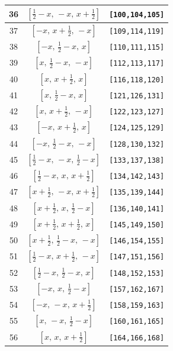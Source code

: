 \documentclass[fleqn,8pt]{jsarticle}
\begin{document}
\begin{longtable}{ccc}
36 & $\left[ \frac{1}{2} - x,\, - x,\, x + \frac{1}{2} \right]$ & {\tt [100,104,105]} \\ \hline
37 & $\left[ - x,\, x + \frac{1}{2},\, - x \right]$ & {\tt [109,114,119]} \\ \hline
38 & $\left[ - x,\, \frac{1}{2} - x,\, x \right]$ & {\tt [110,111,115]} \\ \hline
39 & $\left[ x,\, \frac{1}{2} - x,\, - x \right]$ & {\tt [112,113,117]} \\ \hline
40 & $\left[ x,\, x + \frac{1}{2},\, x \right]$ & {\tt [116,118,120]} \\ \hline
41 & $\left[ x,\, \frac{1}{2} - x,\, x \right]$ & {\tt [121,126,131]} \\ \hline
42 & $\left[ x,\, x + \frac{1}{2},\, - x \right]$ & {\tt [122,123,127]} \\ \hline
43 & $\left[ - x,\, x + \frac{1}{2},\, x \right]$ & {\tt [124,125,129]} \\ \hline
44 & $\left[ - x,\, \frac{1}{2} - x,\, - x \right]$ & {\tt [128,130,132]} \\ \hline
45 & $\left[ \frac{1}{2} - x,\, - x,\, \frac{1}{2} - x \right]$ & {\tt [133,137,138]} \\ \hline
46 & $\left[ \frac{1}{2} - x,\, x,\, x + \frac{1}{2} \right]$ & {\tt [134,142,143]} \\ \hline
47 & $\left[ x + \frac{1}{2},\, - x,\, x + \frac{1}{2} \right]$ & {\tt [135,139,144]} \\ \hline
48 & $\left[ x + \frac{1}{2},\, x,\, \frac{1}{2} - x \right]$ & {\tt [136,140,141]} \\ \hline
49 & $\left[ x + \frac{1}{2},\, x + \frac{1}{2},\, x \right]$ & {\tt [145,149,150]} \\ \hline
50 & $\left[ x + \frac{1}{2},\, \frac{1}{2} - x,\, - x \right]$ & {\tt [146,154,155]} \\ \hline
51 & $\left[ \frac{1}{2} - x,\, x + \frac{1}{2},\, - x \right]$ & {\tt [147,151,156]} \\ \hline
52 & $\left[ \frac{1}{2} - x,\, \frac{1}{2} - x,\, x \right]$ & {\tt [148,152,153]} \\ \hline
53 & $\left[ - x,\, x,\, \frac{1}{2} - x \right]$ & {\tt [157,162,167]} \\ \hline
54 & $\left[ - x,\, - x,\, x + \frac{1}{2} \right]$ & {\tt [158,159,163]} \\ \hline
55 & $\left[ x,\, - x,\, \frac{1}{2} - x \right]$ & {\tt [160,161,165]} \\ \hline
56 & $\left[ x,\, x,\, x + \frac{1}{2} \right]$ & {\tt [164,166,168]} \\ \hline

\end{longtable}
\end{document}
